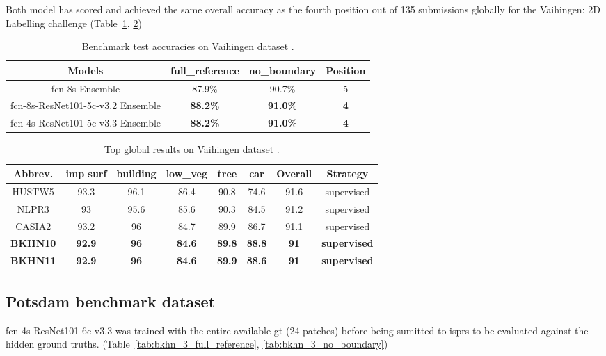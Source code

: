 Both model has scored and achieved the same overall accuracy as the fourth
position out of 135 submissions globally for the Vaihingen: 2D Labelling
challenge (Table~\ref{tab:vaihingen_test},
\ref{tab:vaihingen_benchmark})
\begin{table}[h!]
    \centering
    \begin{tabular}{ | c | c | c | c | }
        \hline
        Models & full\_reference & no\_boundary & Position \\
        \hline
        \acrshort{fcn}-8s Ensemble & 87.9\% & 90.7\% & 5 \\
        \acrshort{fcn}-8s-ResNet101-5c-v3.2 Ensemble & \textbf{88.2\%}
        & \textbf{91.0\%} & \textbf{4} \\
        \acrshort{fcn}-4s-ResNet101-5c-v3.3 Ensemble & \textbf{88.2\%}
        & \textbf{91.0\%} & \textbf{4} \\
        \hline
    \end{tabular}
    \caption{Benchmark test accuracies on Vaihingen dataset
    \cite{bkhn_4, bkhn_10, bkhn_11}.}
    \label{tab:vaihingen_test}
\end{table}

\begin{table}[h!]
    \centering
    \begin{tabular}{ | c | c | c | c | c | c | c | c | }
        \hline
        Abbrev. & imp surf & building & low\_veg & tree & car & Overall
        & Strategy \\
        \hline
        HUSTW5 & 93.3 & 96.1 & 86.4 & 90.8 & 74.6 & 91.6 & supervised \\
        NLPR3 & 93 & 95.6 & 85.6 & 90.3 & 84.5 & 91.2 & supervised \\
        CASIA2 & 93.2 & 96 & 84.7 & 89.9 & 86.7 & 91.1 & supervised \\
        \textbf{BKHN10} & \textbf{92.9} & \textbf{96} & \textbf{84.6}
        & \textbf{89.8} & \textbf{88.8} & \textbf{91}
        & \textbf{supervised} \\
        \textbf{BKHN11} & \textbf{92.9} & \textbf{96} & \textbf{84.6}
        & \textbf{89.9} & \textbf{88.6} & \textbf{91} & \textbf{supervised} \\
        \hline
    \end{tabular}
    \caption{Top global results on Vaihingen dataset
    \cite{vaihingen_benchmark}.}
    \label{tab:vaihingen_benchmark}
\end{table}

\subsection{Potsdam benchmark dataset}
\acrshort{fcn}-4s-ResNet101-6c-v3.3 was trained with the entire available
\gls{gt} (24 patches) before being sumitted to \acrshort{isprs} to be
evaluated against the hidden ground truths.
(Table~\ref{tab:bkhn_3_full_reference}, \ref{tab:bkhn_3_no_boundary})

